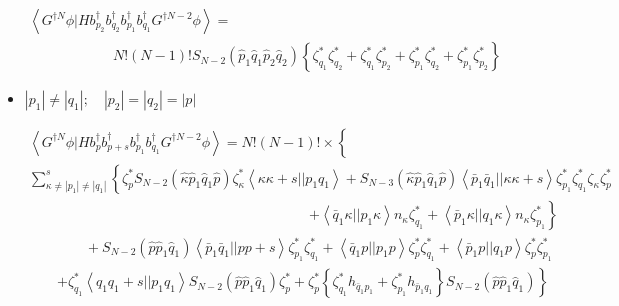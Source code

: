 \begin{eqnarray}
&&\left\langle G^{\dagger N}\phi |Hb_{p_{2}}^{\dagger }b_{q_{2}}^{\dagger
}b_{p_{1}}^{\dagger }b_{q_{1}}^{\dagger }G^{\dagger N-2}\phi \right\rangle =
\nonumber \\
&&\qquad \qquad \qquad N!\left( N-1\right) !S_{N-2}\left( \hat{p}_{1}\hat{q}%
_{1}\hat{p}_{2}\hat{q}_{2}\right) \left\{ \zeta _{q_{1}}^{\ast }\zeta
_{q_{2}}^{\ast }+\zeta _{q_{1}}^{\ast }\zeta _{p_{2}}^{\ast }+\zeta
_{p_{1}}^{\ast }\zeta _{q_{2}}^{\ast }+\zeta _{p_{1}}^{\ast }\zeta
_{p_{2}}^{\ast }\right\}
\end{eqnarray}

\begin{itemize}
\item $\left| p_{1}\right| \neq \left| q_{1}\right| ;\quad \left|
p_{2}\right| =\left| q_{2}\right| =\left| p\right| $
\end{itemize}

\begin{eqnarray}
&&\left\langle G^{\dagger N}\phi |Hb_{p}^{\dagger }b_{p+s}^{\dagger
}b_{p_{1}}^{\dagger }b_{q_{1}}^{\dagger }G^{\dagger N-2}\phi \right\rangle
=N!\left( N-1\right) !\times \left\{ {}\right.  \nonumber \\
&&\sum_{\kappa \neq \left| p_{1}\right| \neq \left| q_{1}\right|
}^{s}\left\{ \zeta _{p}^{\ast }S_{N-2}\left( \hat{\kappa}\hat{p}_{1}\hat{q}%
_{1}\hat{p}\right) \zeta _{\kappa }^{\ast }\left\langle \kappa \kappa
+s||p_{1}q_{1}\right\rangle +S_{N-3}\left( \hat{\kappa}\hat{p}_{1}\hat{q}_{1}%
\hat{p}\right) \left\langle \bar{p}_{1}\bar{q}_{1}||\kappa \kappa
+s\right\rangle \zeta _{p_{1}}^{\ast }\zeta _{q_{1}}^{\ast }\zeta _{\kappa
}\zeta _{p}^{\ast }\right.  \nonumber \\
&&\qquad \qquad \qquad \qquad \qquad \qquad \qquad \qquad \qquad \qquad
\left. +\left\langle \bar{q}_{1}\kappa ||p_{1}\kappa \right\rangle n_{\kappa
}\zeta _{q_{1}}^{\ast }+\left\langle \bar{p}_{1}\kappa ||q_{1}\kappa
\right\rangle n_{\kappa }\zeta _{p_{1}}^{\ast }\right\}  \nonumber \\
&&\qquad \qquad +S_{N-2}\left( \hat{p}\hat{p}_{1}\hat{q}_{1}\right)
\left\langle \bar{p}_{1}\bar{q}_{1}||pp+s\right\rangle \zeta _{p_{1}}^{\ast
}\zeta _{q_{1}}^{\ast }+\left\langle \bar{q}_{1}p||p_{1}p\right\rangle \zeta
_{p}^{\ast }\zeta _{q_{1}}^{\ast }+\left\langle \bar{p}_{1}p||q_{1}p\right%
\rangle \zeta _{p}^{\ast }\zeta _{p_{1}}^{\ast }  \nonumber \\
&&\qquad \left. +\zeta _{q_{1}}^{\ast }\left\langle
q_{1}q_{1}+s||p_{1}q_{1}\right\rangle S_{N-2}\left( \hat{p}\hat{p}_{1}\hat{q}%
_{1}\right) \zeta _{p}^{\ast }+\zeta _{p}^{\ast }\left\{ \zeta
_{q_{1}}^{\ast }h_{\bar{q}_{1}p_{1}}+\zeta _{p_{1}}^{\ast }h_{\bar{p}%
_{1}q_{1}}\right\} S_{N-2}\left( \hat{p}\hat{p}_{1}\hat{q}_{1}\right)
\right\}
\end{eqnarray}

